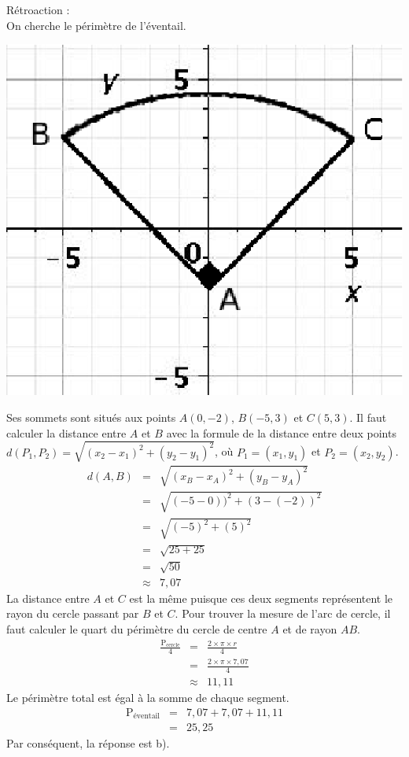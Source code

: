 \documentclass[letterpaper, 12pt]{article}
\begin{document}
R\'etroaction :\\
On cherche le p\'erim\`etre de l'\'eventail.
\begin{center}
 \includegraphics[width=5CM,bb=14 14 259 231]{Q2454.eps}
\end{center}
Ses sommets sont situ\'es aux points $A(0, -2)$, $B(-5, 3)$ et $C(5, 3)$. Il faut calculer la distance entre $A$ et $B$ avec la formule de la distance entre deux points $d(P_{1}, P_{2})=\sqrt{(x_{2}-x_{1})^{2}+(y_{2}-y_{1})^{2}}$, o\`u $P_{1}=(x_{1}, y_{1})$ et $P_{2}=(x_{2}, y_{2})$.
\begin{eqnarray*}
 d(A, B)&=&\sqrt{(x_{B}-x_{A})^{2}+(y_{B}-y_{A})^{2}}\\
&=&\sqrt{(-5-0))^{2}+(3-(-2))^{2}}\\
&=&\sqrt{(-5)^{2}+(5)^{2}}\\
&=&\sqrt{25+25}\\
&=&\sqrt{50}\\
&\approx&7,07
\end{eqnarray*}
La distance entre $A$ et $C$ est la m\^eme puisque ces deux segments repr\'esentent le rayon du cercle passant par $B$ et $C$. Pour trouver la mesure de l'arc de cercle, il faut calculer le quart du p\'erim\`etre du cercle de centre $A$ et de rayon $AB$.
\begin{eqnarray*}
\frac{\textrm{P}_{\textrm{cercle}}}{4}&=&\frac{2 \times \pi \times r}{4}\\[2mm]
&=&\frac{2 \times \pi \times 7,07}{4}\\[2mm]
&\approx&11,11
\end{eqnarray*}
Le p\'erim\`etre total est \'egal \`a la somme de chaque segment.
\begin{eqnarray*}
 \textrm{P}_{\textrm{\'eventail}}&=&7,07+7,07+11,11\\
&=&25,25
\end{eqnarray*}
Par cons\'equent, la r\'eponse est b).\\
\end{document}
